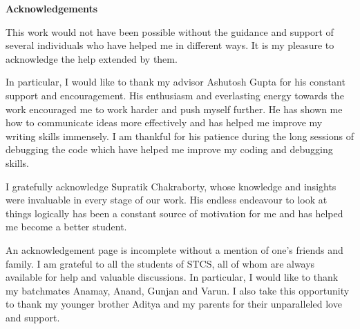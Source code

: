 
\centerline{\bfseries Acknowledgements}
\vspace{0.3 cm}

\noindent This work would not have been possible without the guidance and support of several individuals who have helped me in different ways. It is my pleasure to acknowledge the help extended by them.
\vspace{0.3 cm}

In particular, I would like to thank my advisor Ashutosh Gupta for his constant support and encouragement. His enthusiasm and everlasting energy towards the work encouraged me to work harder and push myself further. He has shown me how to communicate ideas more
effectively and has helped me improve my writing skills immensely. I am thankful for his patience during the long sessions of debugging the code which have helped me improve my coding and debugging skills. 
\vspace{0.3 cm}

I gratefully acknowledge Supratik Chakraborty, whose knowledge and insights were invaluable in every stage of our work. His endless endeavour to look at things logically has been a constant source of motivation for me and has helped me become a better student.

\vspace{0.3 cm}

An acknowledgement page is incomplete without a mention of one's friends and family. I am grateful to all the students of STCS, all of whom are always available for help and valuable discussions. In particular, I would like to thank my batchmates Anamay, Anand, Gunjan and Varun. I also take this opportunity to thank my younger brother Aditya and my parents for their unparalleled love and support.
